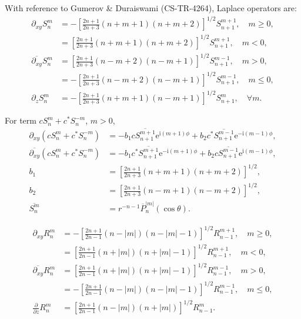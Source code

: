 \documentclass[a4paper,12pt]{article}
\newcommand{\E}{\mathrm{e}}
\newcommand{\J}{\mathrm{i}}
\begin{document}
With reference to Gumerov \& Duraiswami (CS-TR-4264), Laplace
operators are:
\begin{align}
  \partial_{xy} S_{n}^{m}
  &=
    -\left[
    \frac{2n+1}{2n+3}(n+m+1)(n+m+2)
    \right]^{1/2}
    S_{n+1}^{m+1},\quad m \geq 0,\\
  &=
    \left[
    \frac{2n+1}{2n+3}(n+m+1)(n+m+2)
    \right]^{1/2}
    S_{n+1}^{m+1},\quad m < 0,\\
  \overline{\partial_{xy}} S_{n}^{m}
  &=
    \left[
    \frac{2n+1}{2n+3}(n-m+2)(n-m+1)
    \right]^{1/2}
    S_{n+1}^{m-1},\quad m > 0,\\
  &=
    -\left[
    \frac{2n+1}{2n+3}(n-m+2)(n-m+1)
    \right]^{1/2}
    S_{n+1}^{m-1},\quad m \leq 0,\\
  \partial_{z}S_{n}^{m}
  &=
    -\left[
    \frac{2n+1}{2n+3}(n+m+1)(n-m+1)    
    \right]^{1/2}
    S_{n+1}^{m},\quad \forall m.
\end{align}

For term $cS_{n}^{m}+c^{*}S_{n}^{-m}$, $m>0$,
\begin{align}
  \partial_{xy} \left(cS_{n}^{m} + c^{*}S_{n}^{-m}\right)
  &=
    -b_{1}c
    \overline{S_{n+1}^{m+1}}\E^{\J(m+1)\phi}
    +b_{2}c^{*}
    \overline{S_{n+1}^{m-1}}\E^{-\J(m-1)\phi},\\
  \overline{\partial_{xy}} \left(cS_{n}^{m} + c^{*}S_{n}^{-m}\right)
  &=
    -b_{1}c^{*} \overline{S_{n+1}^{m+1}}\E^{-\J(m+1)\phi}
    +b_{2}c \overline{S_{n+1}^{m-1}}\E^{\J(m-1)\phi},\\
  b_{1} &=
          \left[
          \frac{2n+1}{2n+3}(n+m+1)(n+m+2)
          \right]^{1/2},\\
  b_{2} &=
          \left[
          \frac{2n+1}{2n+3}(n-m+1)(n-m+2)
          \right]^{1/2},\\
  \overline{S_{n}^{m}}
  &=
    r^{-n-1}\overline{P}_{n}^{|m|}(\cos\theta).
\end{align}

\begin{align}
  \partial_{xy} R_{n}^{m}
  &=
    -\left[
    \frac{2n+1}{2n-1}(n-|m|)(n-|m|-1)
    \right]^{1/2}
    R_{n-1}^{m+1},\quad m \geq 0,\\
  &=
    \left[
    \frac{2n+1}{2n-1}(n+|m|)(n+|m|-1)
    \right]^{1/2}
    R_{n-1}^{m+1},\quad m < 0,\\
  \overline{\partial_{xy}} R_{n}^{m}
  &=
    \left[
    \frac{2n+1}{2n-1}(n+|m|)(n+|m|-1)
    \right]^{1/2}
    R_{n-1}^{m-1},\quad m > 0,\\
  &=
    -\left[
    \frac{2n+1}{2n-1}(n-|m|)(n-|m|-1)
    \right]^{1/2}
    R_{n-1}^{m-1},\quad m \leq 0,\\
  \frac{\partial}{\partial z}
  R_{n}^{m}
  &=
    \left[
    \frac{2n+1}{2n-1}(n-|m|)(n+|m|)
    \right]^{1/2}
    R_{n-1}^{m}.
\end{align}
\end{document}
